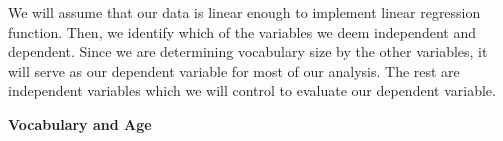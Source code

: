 \documentclass[11pt]{article}  %
\begin{document}
\indent We will assume that our data is linear enough to implement linear regression function. Then, we identify which of the variables we deem independent and dependent. Since we are determining vocabulary size by the other variables, it will serve as our dependent variable for most of our analysis. The rest are independent variables which we will control to evaluate our dependent variable.


\textbf{Vocabulary and Age}
\end{document}
